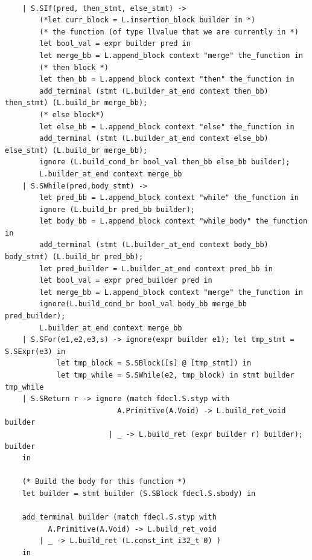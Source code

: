 \documentclass{article}
\begin{document}
\begin{lstlisting}
	
	| S.SIf(pred, then_stmt, else_stmt) -> 
		(*let curr_block = L.insertion_block builder in *)
		(* the function (of type llvalue that we are currently in *)
		let bool_val = expr builder pred in
		let merge_bb = L.append_block context "merge" the_function in
		(* then block *)
		let then_bb = L.append_block context "then" the_function in
		add_terminal (stmt (L.builder_at_end context then_bb) then_stmt) (L.build_br merge_bb);
		(* else block*)
		let else_bb = L.append_block context "else" the_function in 
		add_terminal (stmt (L.builder_at_end context else_bb) else_stmt) (L.build_br merge_bb);	
		ignore (L.build_cond_br bool_val then_bb else_bb builder);
		L.builder_at_end context merge_bb
	| S.SWhile(pred,body_stmt) ->  
		let pred_bb = L.append_block context "while" the_function in
		ignore (L.build_br pred_bb builder);
		let body_bb = L.append_block context "while_body" the_function in
		add_terminal (stmt (L.builder_at_end context body_bb) body_stmt) (L.build_br pred_bb);
		let pred_builder = L.builder_at_end context pred_bb in
		let bool_val = expr pred_builder pred in
		let merge_bb = L.append_block context "merge" the_function in
		ignore(L.build_cond_br bool_val body_bb merge_bb pred_builder);	
		L.builder_at_end context merge_bb
	| S.SFor(e1,e2,e3,s) -> ignore(expr builder e1); let tmp_stmt = S.SExpr(e3) in 
			let tmp_block = S.SBlock([s] @ [tmp_stmt]) in  
			let tmp_while = S.SWhile(e2, tmp_block) in stmt builder tmp_while 
	| S.SReturn r -> ignore (match fdecl.S.styp with
						  A.Primitive(A.Void) -> L.build_ret_void builder
						| _ -> L.build_ret (expr builder r) builder); builder 
	in
	
	(* Build the body for this function *)
	let builder = stmt builder (S.SBlock fdecl.S.sbody) in
		
	add_terminal builder (match fdecl.S.styp with
          A.Primitive(A.Void) -> L.build_ret_void
        | _ -> L.build_ret (L.const_int i32_t 0) )
	in
	

\end{lstlisting}
\end{document}
